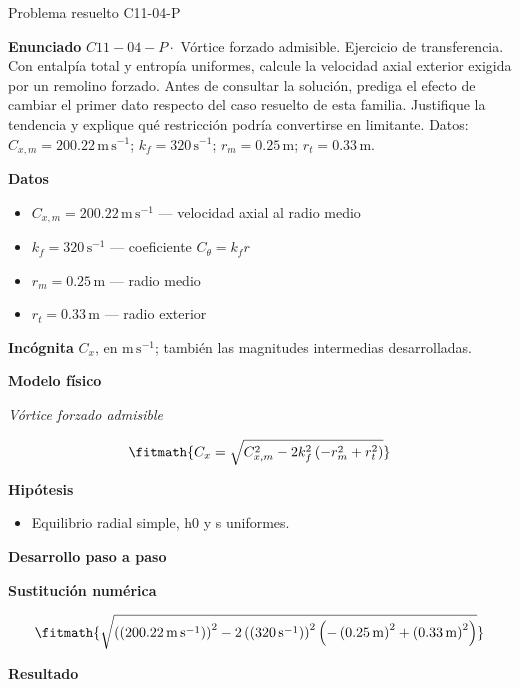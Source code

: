 \documentclass[10pt,openany]{book}
\begin{document}
\begin{studiumworked}{Problema resuelto C11-04-P}


\noindent\textbf{Enunciado}
\(C11-04-P \cdot\) Vórtice forzado admisible. Ejercicio de transferencia. Con entalpía total y entropía uniformes, calcule la velocidad axial exterior exigida por un remolino forzado. Antes de consultar la solución, prediga el efecto de cambiar el primer dato respecto del caso resuelto de esta familia. Justifique la tendencia y explique qué restricción podría convertirse en limitante. Datos: \(C_{x,m}=200.22\, \mathrm{m}\,\mathrm{s}^{-1}\); \(k_f=320\, \mathrm{s}^{-1}\); \(r_m=0.25\, \mathrm{m}\); \(r_t=0.33\, \mathrm{m}\).

\noindent\textbf{Datos}
\begin{itemize}
\item $C_{x,m} = 200.22\,\mathrm{m}\,\mathrm{s}^{-1}$ — velocidad axial al radio medio
\item $k_f = 320\,\mathrm{s}^{-1}$ — coeficiente $C_\theta=k_f r$
\item $r_m = 0.25\,\mathrm{m}$ — radio medio
\item $r_t = 0.33\,\mathrm{m}$ — radio exterior
\end{itemize}

\noindent\textbf{Incógnita}
$C_x$, en $\mathrm{m\,s^{-1}}$; también las magnitudes intermedias desarrolladas.

\noindent\textbf{Modelo físico}

\noindent\textit{Vórtice forzado admisible}

\[
\fitmath{C_x=\sqrt{C_{x,m}^{2} - 2 k_f^{2} \left(- r_m^{2} + r_t^{2}\right)}}
\]

\noindent\textbf{Hipótesis}
\begin{itemize}
\item Equilibrio radial simple, h0 y s uniformes.
\end{itemize}

\noindent\textbf{Desarrollo paso a paso}



\noindent\textbf{Sustitución numérica}

\[
\fitmath{\sqrt{\left(\left(200.22\,\mathrm{m}\,\mathrm{s}^{-1}\right)\right)^{2} - 2 \left(\left(320\,\mathrm{s}^{-1}\right)\right)^{2} \left(- \left(0.25\,\mathrm{m}\right)^{2} + \left(0.33\,\mathrm{m}\right)^{2}\right)}}
\]

\noindent\textbf{Resultado}


\end{studiumworked}
\end{document}

